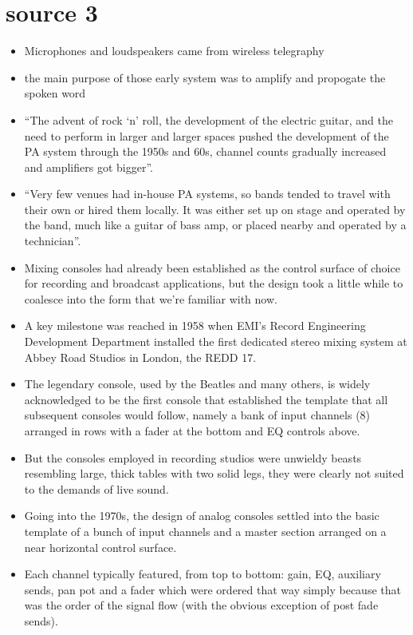 \documentclass[12pt]{article}
\begin{document}
    \section{source 3 \autocite{coulesMixingEvolutionKey2020}}
        \begin{itemize}
            \item Microphones and loudspeakers came from wireless telegraphy
            \item the main purpose of those early system was to amplify and propogate the spoken word
            \item ``The advent of rock `n' roll, the development of the electric guitar, and the need to perform in larger and larger spaces pushed the development of the PA system through the 1950s and 60s, channel counts gradually increased and amplifiers got bigger''.
            \item ``Very few venues had in-house PA systems, so bands tended to travel with their own or hired them locally. It was either set up on stage and operated by the band, much like a guitar of bass amp, or placed nearby and operated by a technician''.
            \item Mixing consoles had already been established as the control surface of choice for recording and broadcast applications, but the design took a little while to coalesce into the form that we're familiar with now.
            \item A key milestone was reached in 1958 when EMI's Record Engineering Development Department installed the first dedicated stereo mixing system at Abbey Road Studios in London, the REDD 17.
            \item The legendary console, used by the Beatles and many others, is widely acknowledged to be the first console that established the template that all subsequent consoles would follow, namely a bank of input channels (8) arranged in rows with a fader at the bottom and EQ controls above.
            \item But the consoles employed in recording studios were unwieldy beasts resembling large, thick tables with two solid legs, they were clearly not suited to the demands of live sound.
            \item Going into the 1970s, the design of analog consoles settled into the basic template of a bunch of input channels and a master section arranged on a near horizontal control surface.
            \item Each channel typically featured, from top to bottom: gain, EQ, auxiliary sends, pan pot and a fader which were ordered that way simply because that was the order of the signal flow (with the obvious exception of post fade sends).

\end{itemize}
\end{document}
